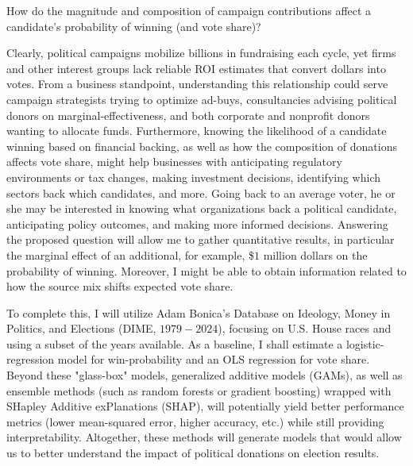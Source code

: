 \documentclass[11pt]{article}
\begin{document}
\begin{center}
How do the magnitude and composition of campaign contributions affect a candidate's probability of winning (and vote share)?
\end{center}

Clearly, political campaigns mobilize billions in fundraising each cycle, yet firms and other interest groups lack reliable ROI estimates that convert dollars into votes. From a business standpoint, understanding this relationship could serve campaign strategists trying to optimize ad-buys, consultancies advising political donors on marginal-effectiveness, and both corporate and nonprofit donors wanting to allocate funds. Furthermore, knowing the likelihood of a candidate winning based on financial backing, as well as how the composition of donations affects vote share, might help businesses with anticipating regulatory environments or tax changes, making investment decisions, identifying which sectors back which candidates, and more. Going back to an average voter, he or she may be interested in knowing what organizations back a political candidate, anticipating policy outcomes, and making more informed decisions. Answering the proposed question will allow me to gather quantitative results, in particular the marginal effect of an additional, for example, \$$1$ million dollars on the probability of winning. Moreover, I might be able to obtain information related to how the source mix shifts expected vote share.

\vskip 5pt
\indent To complete this, I will utilize Adam Bonica's Database on Ideology, Money in Politics, and Elections (DIME, $1979-2024$), focusing on U.S. House races and using a subset of the years available. As a baseline, I shall estimate a logistic-regression model for win-probability and an OLS regression for vote share. Beyond these "glass-box" models, generalized additive models (GAMs), as well as ensemble methods (such as random forests or gradient boosting) wrapped with SHapley Additive exPlanations (SHAP), will potentially yield better performance metrics (lower mean-squared error, higher accuracy, etc.) while still providing interpretability. Altogether, these methods will generate models that would allow us to better understand the impact of political donations on election results. 



\end{document}
